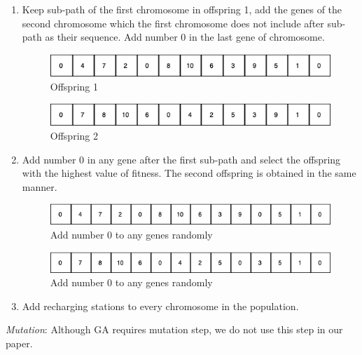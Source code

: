 \documentclass[conference,compsoc]{IEEEtran}
\begin{document}
\begin{enumerate}
    \item Keep sub-path of the first chromosome in offspring 1, add the genes of the second chromosome which the first chromosome does not include after sub-path as their sequence. Add number 0 in the last gene of chromosome.
    
    \begin{figure}[h!]
    \centering
    \includegraphics[scale=0.42]{7}
    \caption{Offspring 1}
    \label{fig:my_label}
\end{figure}
    
    \begin{figure}[h!]
    \centering
    \includegraphics[scale=0.42]{8}
    \caption{Offspring 2}
    \label{fig:my_label}
\end{figure}

    \item Add number 0 in any gene after the first sub-path and select the offspring with the highest value of fitness. The second offspring is obtained in the same manner.
     \begin{figure}[h!]
    \centering
    \includegraphics[scale=0.42]{9}
    \caption{Add number 0 to any genes randomly}
    \label{fig:my_label}
\end{figure}

    \begin{figure}[h!]
    \centering
    \includegraphics[scale=0.42]{10}
    \caption{Add number 0 to any genes randomly}
    \label{fig:my_label}
\end{figure}
    \item Add recharging stations to every chromosome in the population.\\
    
\end{enumerate}

\textit{Mutation}: Although GA requires mutation step, we do not use this step in our paper.\\
\end{document}
